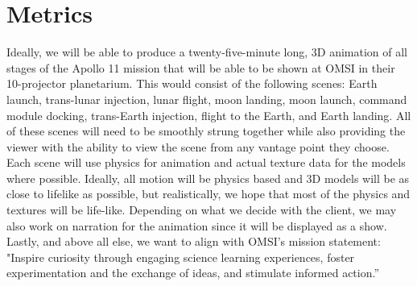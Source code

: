 \documentclass[onecolumn, draftclsnofoot,10pt, compsoc]{IEEEtran}
\begin{document}
\section{Metrics}
Ideally, we will be able to produce a twenty-five-minute long, 3D animation of all stages of the Apollo 11 mission that will be able to be shown at OMSI in their 10-projector planetarium. This would consist of the following scenes: Earth launch, trans-lunar injection, lunar flight, moon landing, moon launch, command module docking, trans-Earth injection, flight to the Earth, and Earth landing. All of these scenes will need to be smoothly strung together while also providing the viewer with the ability to view the scene from any vantage point they choose. Each scene will use physics for animation and actual texture data for the models where possible. Ideally, all motion will be physics based and 3D models will be as close to lifelike as possible, but realistically, we hope that most of the physics and textures will be life-like. Depending on what we decide with the client, we may also work on narration for the animation since it will be displayed as a show. Lastly, and above all else, we want to align with OMSI’s mission statement: "Inspire curiosity through engaging science learning experiences, foster experimentation and the exchange of ideas, and stimulate informed action.” 
\end{document}
